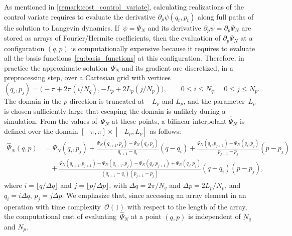 \documentclass[11pt,a4paper]{article}
\theoremstyle{plain}
\numberwithin{equation}{section}
\renewcommand{\leq}{\leqslant}
\begin{document}
As mentioned in \cref{remark:cost_control_variate},
calculating realizations of the control variate requires to evaluate the derivative $\partial_p \psi(q_t, p_t)$ along full paths of the solution to Langevin dynamics.
If~$\psi = \Psi_N$ and its derivative $\partial_p \psi = \partial_p \Psi_N$ are stored as arrays of Fourier/Hermite coefficients,
then the evaluation of $\partial_p \Psi_N$ at a configuration $(q, p)$ is computationally expensive
because it requires to evaluate all the basis functions~\eqref{eq:basis_functions} at this configuration.
Therefore, in practice the approximate solution~$\Psi_N$ and its gradient are discretized, in a preprocessing step,
over a Cartesian grid with vertices
\[
    (q_i, p_j) = \bigl(- \pi + 2\pi(i/N_q) , - L_p + 2L_p (j/N_p) \bigr), \qquad 0 \leq i \leq N_q, \quad 0 \leq j \leq N_p.
\]
The domain in the $p$ direction is truncated at $-L_p$ and $L_p$,
and the parameter~$L_p$ is chosen sufficiently large that escaping the domain is unlikely during a simulation.
From the values of~$\Psi_N$ at these points,
a bilinear interpolant $\widehat \Psi_N$ is defined over the domain $[-\pi, \pi] \times [-L_p, L_p]$ as follows:
\begin{align*}
    \widehat \Psi_N(q, p)
    &= \Psi_N(q_i,p_j) + \frac{\Psi_N(q_{i+1}, p_j) - \Psi_N(q_i, p_j)}{q_{i+1} - q_i} (q - q_i)
    +\frac{\Psi_N(q_{i}, p_{j+1}) - \Psi_N(q_{i}, p_{j})}{p_{j+1} - p_j} (p - p_j) \\
    &\quad + \frac{\Psi_N(q_{i+1}, p_{j+1}) - \Psi_N(q_{i+1}, p_{j}) - \Psi_N(q_{i}, p_{j+1}) + \Psi_N(q_{i}, p_{j})}{(q_{i+1} - q_i)(p_{j+1} - p_j)}  (q-q_i)(p-p_j),
\end{align*}
where $i = \lfloor q / \Delta q \rfloor$ and $j = \lfloor p / \Delta p \rfloor$,
with $\Delta q = 2\pi/N_q$ and $\Delta p = 2L_p/N_p$, and $q_i = i \Delta q$, $p_j = j \Delta p$.
We emphasize that,
since accessing an array element in an operation with time complexity~$\mathcal O(1)$ with respect to the length of the array,
the computational cost of evaluating~$\widehat \Psi_N$ at a point $(q,p)$ is independent of $N_q$ and $N_p$.
\end{document}
